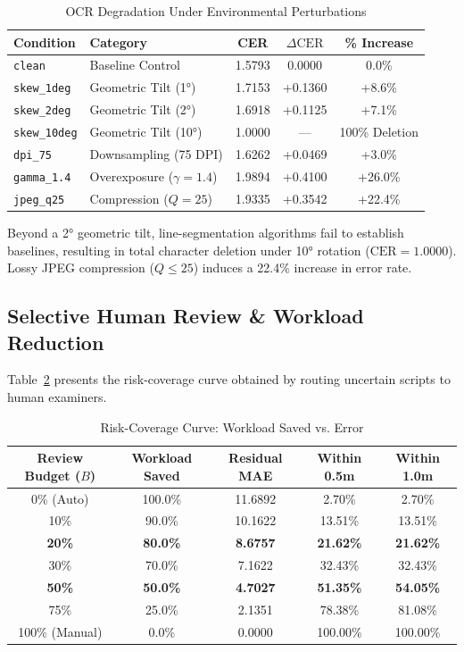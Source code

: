 \documentclass[journal]{IEEEtran}
\begin{document}
\begin{table}[htbp]
\centering
\caption{OCR Degradation Under Environmental Perturbations}
\label{tab:perturbation}
\begin{tabular}{llccc}
\toprule
\textbf{Condition} & \textbf{Category} & \textbf{CER} & \textbf{$\Delta\text{CER}$} & \textbf{\% Increase} \\
\midrule
\texttt{clean} & Baseline Control & 1.5793 & 0.0000 & 0.0\% \\
\texttt{skew\_1deg} & Geometric Tilt (1°) & 1.7153 & +0.1360 & +8.6\% \\
\texttt{skew\_2deg} & Geometric Tilt (2°) & 1.6918 & +0.1125 & +7.1\% \\
\texttt{skew\_10deg} & Geometric Tilt (10°) & 1.0000 & --- & 100\% Deletion \\
\texttt{dpi\_75} & Downsampling (75 DPI) & 1.6262 & +0.0469 & +3.0\% \\
\texttt{gamma\_1.4} & Overexposure ($\gamma = 1.4$) & 1.9894 & +0.4100 & +26.0\% \\
\texttt{jpeg\_q25} & Compression ($Q = 25$) & 1.9335 & +0.3542 & +22.4\% \\
\bottomrule
\end{tabular}
\end{table}

Beyond a 2° geometric tilt, line-segmentation algorithms fail to establish baselines, resulting in total character deletion under 10° rotation ($\text{CER} = 1.0000$). Lossy JPEG compression ($Q \le 25$) induces a 22.4\% increase in error rate.

\subsection{Selective Human Review \& Workload Reduction}
Table~\ref{tab:selective_review} presents the risk-coverage curve obtained by routing uncertain scripts to human examiners.

\begin{table}[htbp]
\centering
\caption{Risk-Coverage Curve: Workload Saved vs. Error}
\label{tab:selective_review}
\begin{tabular}{ccccc}
\toprule
\textbf{Review Budget ($B$)} & \textbf{Workload Saved} & \textbf{Residual MAE} & \textbf{Within 0.5m} & \textbf{Within 1.0m} \\
\midrule
0\% (Auto) & 100.0\% & 11.6892 & 2.70\% & 2.70\% \\
10\% & 90.0\% & 10.1622 & 13.51\% & 13.51\% \\
\textbf{20\%} & \textbf{80.0\%} & \textbf{8.6757} & \textbf{21.62\%} & \textbf{21.62\%} \\
30\% & 70.0\% & 7.1622 & 32.43\% & 32.43\% \\
\textbf{50\%} & \textbf{50.0\%} & \textbf{4.7027} & \textbf{51.35\%} & \textbf{54.05\%} \\
75\% & 25.0\% & 2.1351 & 78.38\% & 81.08\% \\
100\% (Manual) & 0.0\% & 0.0000 & 100.00\% & 100.00\% \\
\bottomrule
\end{tabular}
\end{table}
\end{document}
